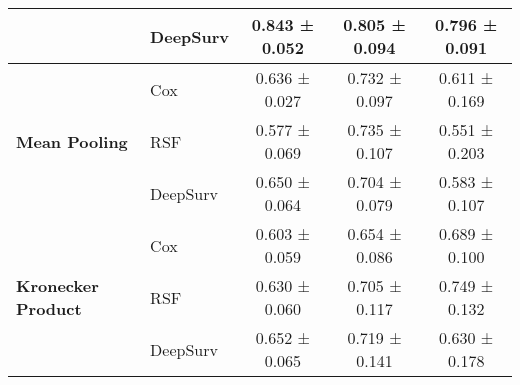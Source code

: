 \begin{sidewaystable}[htbp]
\begin{tabular}{@{}llccc@{}}
        & DeepSurv & 0.843 ± 0.052 & 0.805 ± 0.094 & 0.796 ± 0.091 \\
        \midrule
        \multirow{3}{*}{\textbf{Mean Pooling}} & Cox & 0.636 ± 0.027 & 0.732 ± 0.097 & 0.611 ± 0.169 \\
        & RSF & 0.577 ± 0.069 & 0.735 ± 0.107 & 0.551 ± 0.203 \\
        & DeepSurv & 0.650 ± 0.064 & 0.704 ± 0.079 & 0.583 ± 0.107 \\
        \midrule
        \multirow{3}{*}{\textbf{Kronecker Product}} & Cox & 0.603 ± 0.059 & 0.654 ± 0.086 & 0.689 ± 0.100 \\
        & RSF & 0.630 ± 0.060 & 0.705 ± 0.117 & 0.749 ± 0.132 \\
        & DeepSurv & 0.652 ± 0.065 & 0.719 ± 0.141 & 0.630 ± 0.178 \\
        \bottomrule
    \end{tabular}
\end{sidewaystable}